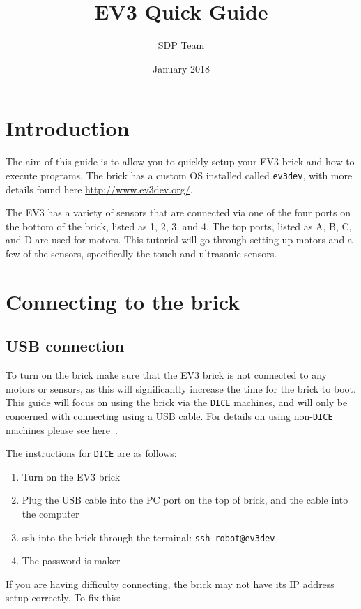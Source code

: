\documentclass{article}
\title{EV3 Quick Guide}
\author{SDP Team}
\date{January 2018}
\begin{document}
\maketitle

\section{Introduction}
The aim of this guide is to allow you to quickly setup your EV3 brick and how to execute programs. The brick has a custom OS installed called \texttt{ev3dev}, with more details found here \url{http://www.ev3dev.org/}. 

The EV3 has a variety of sensors that are connected via one of the four ports on the bottom of the brick, listed as 1, 2, 3, and 4. The top ports, listed as A, B, C, and D are used for motors. This tutorial will go through setting up motors and a few of the sensors, specifically the touch and ultrasonic sensors. 

\section{Connecting to the brick}
\subsection{USB connection}
To turn on the brick make sure that the EV3 brick is not connected to any motors or sensors, as this will significantly increase the time for the brick to boot. This guide will focus on using the brick via the \texttt{DICE} machines, and will only be concerned with connecting using a USB cable. For details on using non-\texttt{DICE} machines please see here~\cite{connectUSb}.

The instructions for \texttt{DICE} are as follows:

\begin{enumerate}
    \item Turn on the EV3 brick
    \item Plug the USB cable into the PC port on the top of brick, and the cable into the computer
    \item ssh into the brick through the terminal: \texttt{ssh robot@ev3dev}
    \item The password is maker
\end{enumerate}

If you are having difficulty connecting, the brick may not have its IP address setup correctly. To fix this:
\end{document}
